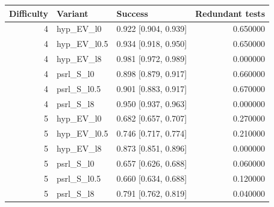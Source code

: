 \begin{tabular}{rllr}
\toprule
Difficulty & Variant & Success & Redundant tests \\
\midrule
4 & hyp\_EV\_l0 & 0.922 [0.904, 0.939] & 0.650000 \\
4 & hyp\_EV\_l0.5 & 0.934 [0.918, 0.950] & 0.650000 \\
4 & hyp\_EV\_l8 & 0.981 [0.972, 0.989] & 0.000000 \\
4 & psrl\_S\_l0 & 0.898 [0.879, 0.917] & 0.660000 \\
4 & psrl\_S\_l0.5 & 0.901 [0.883, 0.917] & 0.670000 \\
4 & psrl\_S\_l8 & 0.950 [0.937, 0.963] & 0.000000 \\
5 & hyp\_EV\_l0 & 0.682 [0.657, 0.707] & 0.270000 \\
5 & hyp\_EV\_l0.5 & 0.746 [0.717, 0.774] & 0.210000 \\
5 & hyp\_EV\_l8 & 0.873 [0.851, 0.896] & 0.000000 \\
5 & psrl\_S\_l0 & 0.657 [0.626, 0.688] & 0.060000 \\
5 & psrl\_S\_l0.5 & 0.660 [0.634, 0.688] & 0.120000 \\
5 & psrl\_S\_l8 & 0.791 [0.762, 0.819] & 0.040000 \\
\bottomrule
\end{tabular}
